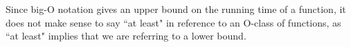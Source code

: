 
Since big-O notation gives an upper bound on the running time of a function,
it does not make sense to say ``at least" in reference to an O-class of functions,
as ``at least" implies that we are referring to a lower bound.
